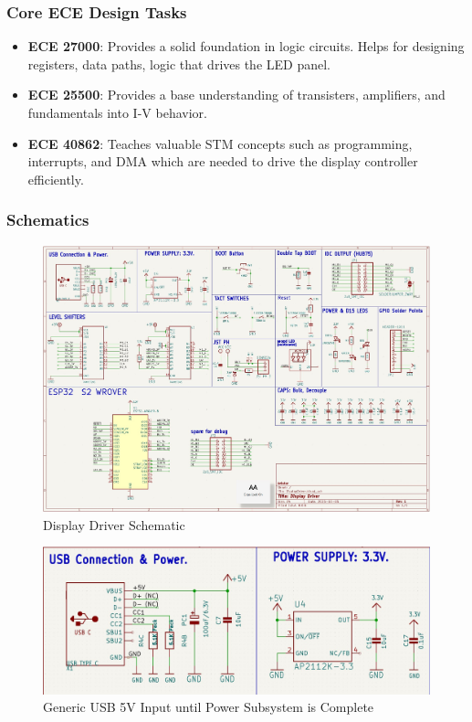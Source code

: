 \subsubsection{Core ECE Design Tasks}
\begin{itemize}
    \item \textbf{ECE 27000}: Provides a solid foundation in logic circuits. Helps for designing registers, data paths, logic that drives the LED panel.
    \item \textbf{ECE 25500}: Provides a base understanding of transisters, amplifiers, and fundamentals into I-V behavior.
    \item \textbf{ECE 40862}: Teaches valuable STM concepts such as programming, interrupts, and DMA which are needed to drive the display controller efficiently.
\end{itemize}

\subsubsection{Schematics}

\begin{figure}[H]
    \centering
    \includegraphics[width=12cm]{images/DisplayDriver/DisplayDriver Schematic.jpg}
    \caption{Display Driver Schematic}
\end{figure}

\begin{figure}[H]
    \centering
    \includegraphics[width=12cm]{images/DisplayDriver/USBPwrGeneric.jpg}
    \caption{Generic USB 5V Input until Power Subsystem is Complete}
\end{figure}

